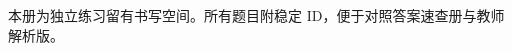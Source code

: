 \newif\ifteacher
\teacherfalse

\renewcommand{\EditionName}{习题册}

\noindent\textcolor{muted}{本册为独立练习留有书写空间。所有题目附稳定 ID，便于对照答案速查册与教师解析版。}
\bigskip


